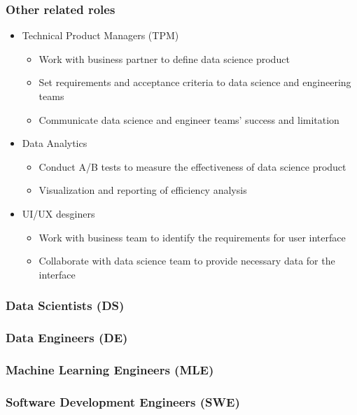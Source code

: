 \documentclass[aspectratio=169,xcolor=x11names,table]{beamer}
\begin{document}
\begin{frame}
	\frametitle{Other related roles}
	\begin{itemize}
		\item<1> Technical Product Managers (TPM)
			\begin{itemize}
				\item Work with business partner to define data science product
				\item Set requirements and acceptance criteria to data science and engineering teams
				\item Communicate data science and engineer teams' success and limitation
			\end{itemize}
			\vspace{5mm}
		\item<2> Data Analytics
			\begin{itemize}
				\item Conduct A/B tests to measure the effectiveness of data science product
				\item Visualization and reporting of efficiency analysis
			\end{itemize}
			\vspace{5mm}
		\item<3> UI/UX desginers
			\begin{itemize}
				\item Work with business team to identify the requirements for user interface
				\item Collaborate with data science team to provide necessary data for the interface
			\end{itemize}
	\end{itemize}
\end{frame}

\begin{frame}
	\frametitle{Data Scientists (DS)}
\end{frame}

\begin{frame}
	\frametitle{Data Engineers (DE)}
\end{frame}

\begin{frame}
	\frametitle{Machine Learning Engineers (MLE)}
\end{frame}

\begin{frame}
	\frametitle{Software Development Engineers (SWE)}
\end{frame}

\end{document}
